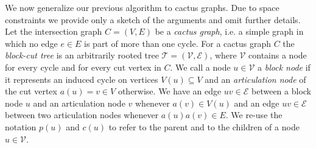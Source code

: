 \documentclass[a4paper,english,numberwithinsect]{eurocg18}
\begin{document}
We now generalize our previous algorithm to cactus graphs. 
Due to space constraints we provide only a sketch of the arguments and omit further details.
Let the intersection graph $ C = (V,E) $ be a \emph{cactus graph}, i.e. a simple graph in which no edge $ e \in E $ is part of more than one cycle. 
For a cactus graph $ C $ the \emph{block-cut tree} is an arbitrarily rooted tree $ \mathcal T = (\mathcal V, \mathcal E) $, where $ \mathcal V $ contains a node for every cycle and for every cut vertex in $ C $. 
We call a node $ u \in \mathcal V $ a \emph{block node} if it represents an induced cycle on vertices $ V(u) \subseteq V $ and an \emph{articulation node} of the cut vertex $ a(u) = v \in V $ otherwise. 
We have an edge $ uv \in \mathcal E $ between a block node $ u $ and an articulation node $ v $ whenever $ a(v) \in V(u) $ and an edge $ uv \in \mathcal E $ between two articulation nodes whenever $ a(u)a(v) \in E$. %
We re-use the notation $p(u)$ and $c(u)$ to refer to the parent and to the children of a node $u \in \mathcal V$.
\end{document}
